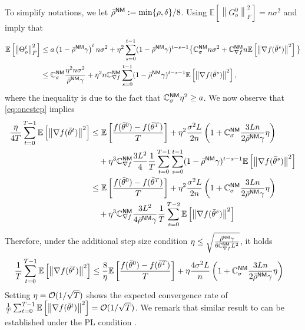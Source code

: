 \documentclass[10pt]{article} %
\theoremstyle{plain}
\theoremstyle{definition}
\theoremstyle{remark}
\newcommand{\prm}{\theta}
\newcommand{\avgtheta}{\bar{\prm}}
\newcommand{\norm}[1]{\left\| #1 \right\|}
\newcommand{\nl}{\nonumber\\}
\newcommand{\ConstSS}{\mathbb{C}_\sigma^{\sf NM}}
\newcommand{\ConstFF}{\mathbb{C}_{\nabla f}^{\sf NM}}
\newcommand{\bbrho}{\bar{\rho}^{\sf NM}}
\begin{document}
    To simplify notations, we let $\bbrho := \min\{ \rho, \delta \}/8$. Using $\mathbb{E} [ \norm{G_o^0}_F^2 ] = n \sigma^2$ and  imply that 
    \begin{align}
        \mathbb{E} \left[ \norm{ \Theta_o^t }_F^2 \right] & \leq a \left( 1 - \bbrho \gamma \right)^t n \sigma^2 + \eta^2 \sum_{s=0}^{t-1} (1 - \bbrho \gamma)^{t-s-1}\big\{  \ConstSS n \sigma^2 + \ConstFF n \mathbb{E} \left[ \norm{ \nabla f( \bar{\theta}^s ) }^2 \right] \big\} \nl
        & \leq \ConstSS \frac{ \eta^2 n \sigma^2 }{ \bbrho \gamma } + \eta^2 n \ConstFF \sum_{s=0}^{t-1} (1 - \bbrho \gamma)^{t-s-1} \mathbb{E} \left[ \norm{ \nabla f( \bar{\theta}^s ) }^2 \right], \label{eq:thetao_fin}
    \end{align}
    where the inequality is due to the fact that $\ConstSS \eta^2 \geq a$. 
    We now observe that \eqref{eq:onestep} implies
    \begin{align*}
        \frac{\eta}{4 T} \sum_{t=0}^{T-1} \mathbb{E} \left[ \norm{ \nabla f( \avgtheta^t)}^2 \right] & \leq \mathbb{E} \left[ \frac{f( \avgtheta^0 ) - f( \avgtheta^{T})}{T} \right] + \eta^2 \frac{\sigma^2 L}{2n} \left( 1 + \ConstSS \frac{3Ln}{2 \bbrho \gamma} \eta \right) \\
        & \quad + \eta^3 \ConstFF \frac{3L^2}{4} \frac{1}{T} \sum_{t=0}^{T-1} \sum_{s=0}^{t-1} (1 - \bbrho \gamma)^{t-s-1} \mathbb{E} \left[ \norm{ \nabla f( \bar{\theta}^s ) }^2 \right] \\
        & \leq \mathbb{E} \left[ \frac{f( \avgtheta^0 ) - f( \avgtheta^{T})}{T} \right] + \eta^2 \frac{\sigma^2 L}{2n} \left( 1 + \ConstSS \frac{3Ln}{2 \bbrho \gamma} \eta \right) \\
        & \quad + \eta^3 \ConstFF \frac{3L^2}{4 \bbrho \gamma } \frac{1}{T} \sum_{s=0}^{T-2} \mathbb{E} \left[ \norm{ \nabla f( \bar{\theta}^s ) }^2 \right]
    \end{align*}
    Therefore, under the additional step size condition $\eta \leq \sqrt{\frac{ \bbrho \gamma}{6 \ConstFF L^2}}$, it holds
    \begin{align}
        \frac{1}{ T} \sum_{t=0}^{T-1} \mathbb{E} \left[ \norm{ \nabla f( \avgtheta^t)}^2 \right] & \leq \frac{8}{\eta} \mathbb{E} \left[ \frac{f( \avgtheta^0 ) - f( \avgtheta^{T})}{T} \right] + \eta \frac{4 \sigma^2 L}{n} \left( 1 + \ConstSS \frac{3Ln}{2 \bbrho \gamma} \eta \right) \label{eq:docom_beta}
    \end{align}
    Setting $\eta = {\cal O}(1 / \sqrt{T})$ shows the expected convergence rate of $\frac{1}{ T} \sum_{t=0}^{T-1} \mathbb{E} \left[ \norm{ \nabla f( \avgtheta^t)}^2 \right] = {\cal O}( 1 / \sqrt{T} )$. We remark that similar result to  can be established under the PL condition .
\end{document}
